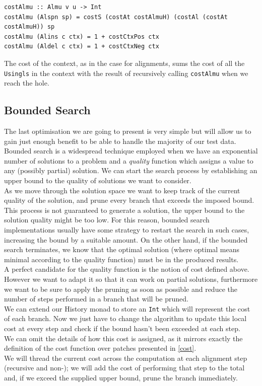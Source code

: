 \documentclass[11pt, titlepage]{article}
\newcommand{\toHaskell}[1]{\texttt{#1}\xspace}
\begin{document}
\begin{verbatim}
costAlmu :: Almu v u -> Int
costAlmu (Alspn sp) = costS (costAt costAlmuH) (costAl (costAt costAlmuH)) sp
costAlmu (Alins c ctx) = 1 + costCtxPos ctx
costAlmu (Aldel c ctx) = 1 + costCtxNeg ctx
\end{verbatim}

The cost of the context, as in the case for alignments, sums the cost of all the \toHaskell{Usingls} in the context with the result of recursively calling \toHaskell{costAlmu} when we reach the hole.


\subsection{Bounded Search}\label{bd-search}

The last optimisation we are going to present is very simple but will allow us to gain just enough benefit to be able to handle the majority of our test data. 
Bounded search is a widespread technique employed when we have an exponential number of solutions to a problem and a \emph{quality} function which assigns a value to any (possibly partial) solution. We can start the search process by establishing an upper bound to the quality of solutions we want to consider. 
\\
As we move through the solution space we want to keep track of the current quality of the solution, and prune every branch that exceeds the imposed bound. 
This process is not guaranteed to generate a solution, the upper bound to the solution quality might be too low. For this reason, bounded search implementations usually have some strategy to restart the search in such cases, increasing the bound by a suitable amount. On the other hand, if the bounded search terminates, we know that the optimal solution (where optimal means minimal according to the quality function) must be in the produced results.
\\
A perfect candidate for the quality function is the notion of cost defined above. However we want to adapt it so that it can work on partial solutions, furthermore we want to be sure to apply the pruning as soon as possible and reduce the number of steps performed in a branch that will be pruned.
\\
We can extend our History monad to store an \texttt{Int} which will represent the cost of each branch. Now we just have to change the algorithm to update this local cost at every step and check if the bound hasn't been exceeded at each step. 
\\
We can omit the details of how this cost is assigned, as it mirrors exactly the definition of the cost function over patches presented in \ref{cost}. 
\\
We will thread the current cost across the computation at each alignment step (recursive and non-); we will add the cost of performing that step to the total and, if we exceed the supplied upper bound, prune the branch immediately.
\end{document}
